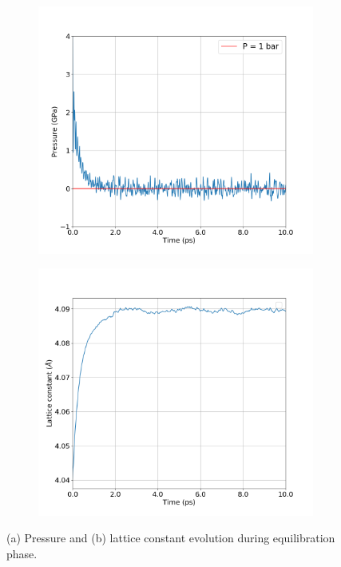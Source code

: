 \begin{figure}[!htbp]
	\begin{subfigure}[b]{0.5\textwidth}
		\includegraphics[width=\textwidth]{figs/task3-pres.png} 
		\caption{}
		\label{fig3-3a}
	\end{subfigure}%
	\begin{subfigure}[b]{0.5\textwidth}
		\includegraphics[width=\textwidth]{figs/task3-a.png} 
		\caption{}
		\label{fig3-3b}
	\end{subfigure}
	\caption{(a) Pressure and (b) lattice constant evolution during equilibration phase.}
\end{figure}

